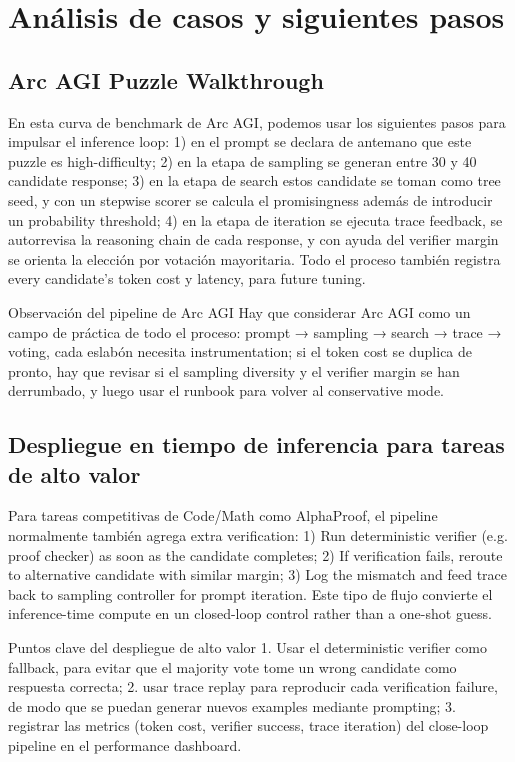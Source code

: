 \section{Análisis de casos y siguientes pasos}

\subsection{Arc AGI Puzzle Walkthrough}
En esta curva de benchmark de Arc AGI, podemos usar los siguientes pasos para impulsar el inference loop: 1) en el prompt se declara de antemano que este puzzle es high-difficulty; 2) en la etapa de sampling se generan entre 30 y 40 candidate response; 3) en la etapa de search estos candidate se toman como tree seed, y con un stepwise scorer se calcula el promisingness además de introducir un probability threshold; 4) en la etapa de iteration se ejecuta trace feedback, se autorrevisa la reasoning chain de cada response, y con ayuda del verifier margin se orienta la elección por votación mayoritaria. Todo el proceso también registra every candidate's token cost y latency, para future tuning.

\begin{importantbox}{Observación del pipeline de Arc AGI}
Hay que considerar Arc AGI como un campo de práctica de todo el proceso: prompt → sampling → search → trace → voting, cada eslabón necesita instrumentation; si el token cost se duplica de pronto, hay que revisar si el sampling diversity y el verifier margin se han derrumbado, y luego usar el runbook para volver al conservative mode.
\end{importantbox}

\subsection{Despliegue en tiempo de inferencia para tareas de alto valor}
Para tareas competitivas de Code/Math como AlphaProof, el pipeline normalmente también agrega extra verification: 1) Run deterministic verifier (e.g. proof checker) as soon as the candidate completes; 2) If verification fails, reroute to alternative candidate with similar margin; 3) Log the mismatch and feed trace back to sampling controller for prompt iteration. Este tipo de flujo convierte el inference-time compute en un closed-loop control rather than a one-shot guess.

\begin{knowledgebox}{Puntos clave del despliegue de alto valor}
1. Usar el deterministic verifier como fallback, para evitar que el majority vote tome un wrong candidate como respuesta correcta; 2. usar trace replay para reproducir cada verification failure, de modo que se puedan generar nuevos examples mediante prompting; 3. registrar las metrics (token cost, verifier success, trace iteration) del close-loop pipeline en el performance dashboard.
\end{knowledgebox}

